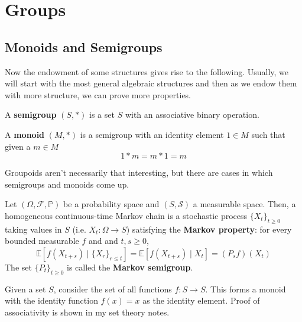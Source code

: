 \section{Groups} 

\subsection{Monoids and Semigroups} 

  Now the endowment of some structures gives rise to the following. Usually, we will start with the most general algebraic structures and then as we endow them with more structure, we can prove more properties. 

  \begin{definition}[Semigroup]
    A \textbf{semigroup} $(S, *)$ is a set $S$ with an associative binary operation. 
  \end{definition} 

  \begin{definition}[Monoid]
    A \textbf{monoid} $(M, *)$ is a semigroup with an identity element $1 \in M$ such that given a $m \in M$
    \begin{equation}
      1 * m = m * 1 = m
    \end{equation}
  \end{definition}

  Groupoids aren't necessarily that interesting, but there are cases in which semigroups and monoids come up. 

  \begin{example}
    Let $(\Omega, \mathcal{F}, \mathbb{P})$ be a probability space and $(S, \mathcal{S})$ a measurable space. Then, a homogeneous continuous-time Markov chain is a stochastic process $\{X_t\}_{t \geq 0}$ taking values in $S$ (i.e. $X_t: \Omega \rightarrow S$) satisfying the \textbf{Markov property}: for every bounded measurable $f$ and and $t, s \geq 0$, 
    \begin{equation}
      \mathbb{E}[ f(X_{t + s}) \mid \{X_r\}_{r \leq t} ] = \mathbb{E}[ f(X_{t + s}) \mid X_t ] = (P_s f)(X_t)
    \end{equation}
    The set $\{P_t\}_{t \geq 0}$ is called the \textbf{Markov semigroup}. 
  \end{example} 

  \begin{example}
    Given a set $S$, consider the set of all functions $f: S \rightarrow S$. This forms a monoid with the identity function $f(x) = x$ as the identity element. Proof of associativity is shown in my set theory notes. 
  \end{example} 

